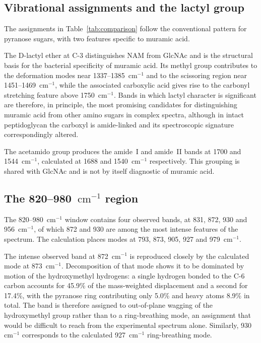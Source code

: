 \documentclass[preprint,12pt]{elsarticle}
\newcommand{\wn}{\ensuremath{\mathrm{cm}^{-1}}}
\begin{document}
\subsection{Vibrational assignments and the lactyl group}

The assignments in Table~\ref{tab:comparison} follow the conventional pattern
for pyranose sugars, with two features specific to muramic acid.

The D-lactyl ether at C-3 distinguishes NAM from GlcNAc and is the structural
basis for the bacterial specificity of muramic acid. Its methyl group
contributes to the deformation modes near 1337--1385~\wn{} and to the
scissoring region near 1451--1469~\wn{}, while the associated carboxylic acid
gives rise to the carbonyl stretching feature above 1750~\wn{}. Bands in
which lactyl character is significant are therefore, in principle, the most
promising candidates for distinguishing muramic acid from other amino sugars
in complex spectra, although in intact peptidoglycan the carboxyl is
amide-linked and its spectroscopic signature correspondingly altered.

The acetamido group produces the amide~I and amide~II bands at 1700 and
1544~\wn{}, calculated at 1688 and 1540~\wn{} respectively. This grouping is
shared with GlcNAc and is not by itself diagnostic of muramic acid.

\subsection{The 820--980~\wn{} region}
\label{sec:anomer}

The 820--980~\wn{} window contains four observed bands, at 831, 872, 930 and
956~\wn{}, of which 872 and 930 are among the most intense features of the
spectrum. The calculation places modes at 793, 873, 905, 927 and 979~\wn{}.

The intense observed band at 872~\wn{} is reproduced closely by the calculated
mode at 873~\wn{}. Decomposition of that mode shows it to be dominated by
motion of the hydroxymethyl hydrogens: a single hydrogen bonded to the C-6
carbon accounts for 45.9\% of the mass-weighted displacement and a second for
17.4\%, with the pyranose ring contributing only 5.0\% and heavy atoms 8.9\%
in total. The band is therefore assigned to out-of-plane wagging of the
hydroxymethyl group rather than to a ring-breathing mode, an assignment that
would be difficult to reach from the experimental spectrum alone. Similarly,
930~\wn{} corresponds to the calculated 927~\wn{} ring-breathing mode.
\end{document}
